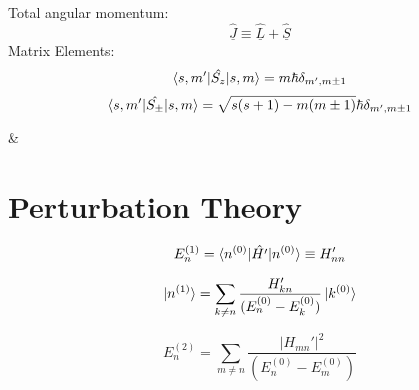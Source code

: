 \documentclass[table,cmyk]{article}
\begin{document}
\begin{longtable}
{\begin{minipage}{7.4cm}
\end{minipage}
}
\vspace{0.3cm}

Total angular momentum:
\[ \hat{\underline{J}} \equiv \hat{\underline{L}}+\hat{\underline{S}}\]
Matrix Elements:
\[\braket{s,m'|\hat{S_z}|s,m} = m\hbar \delta_{m',m\pm1}\]
\[\braket{s,m'|\hat{S_{\pm}}|s,m} = \sqrt{s(s+1)-m(m\pm1)} \hbar \delta_{m',m\pm1}\]

&
\section*{Perturbation Theory}
\[E_n^{(1)} = \braket{n^{(0)}|\hat{H'}|n^{(0)}} \equiv H_{nn}'\]

\[ \ket{n^{(1)}} = \sum_{k\ne n} \frac{H_{kn}'}{(E_n^{(0)}-E_k^{(0)})}\ket{k^{(0)}}\]

\[E_n^{(2)} = \sum_{m\ne n} \frac{|H_{mn}'|^2}{(E_n^{(0)}-E_m^{(0)})}\]




\tabularnewline\hline
\end{longtable}
\end{document}
